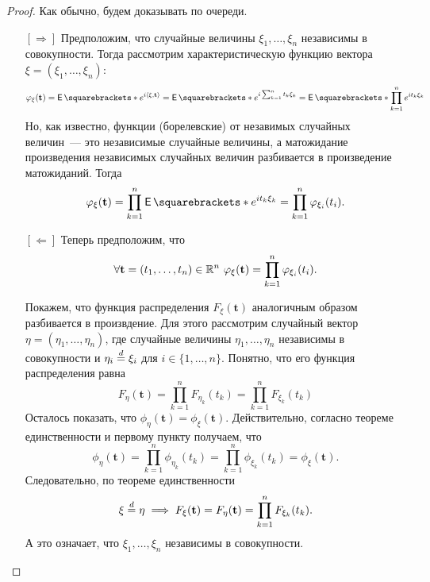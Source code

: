 \begin{proof}
	Как обычно, будем доказывать по очереди.
	\begin{itemize}
		\item[{\([\Rightarrow]\)}] Предположим, что случайные величины \(\xi_{1}, \dots, \xi_{n}\) независимы в совокупности. Тогда рассмотрим характеристическую функцию вектора \(\xi = (\xi_1, \dots, \xi_n)\):
		\[
			\phi_{\xi}(\mathbf{t}) = \E{e^{i\left\langle\xi, \mathbf{t}\right\rangle}} = \E{e^{i\sum_{k = 1}^{n} t_k\xi_k}} = \E{\prod_{k = 1}^{n} e^{it_k\xi_{k}}}
		\]
		Но, как известно, функции (борелевские) от незавимых случайных величин~--- это независимые случайные величины, а матожидание произведения независимых случайных величин разбивается в произведение матожиданий. Тогда
		\[
			\phi_{\xi}(\mathbf{t}) = \prod_{k = 1}^{n} \E{e^{it_k\xi_{k}}} = \prod_{k = 1}^{n} \phi_{\xi_i}(t_i).
		\]
		
		\item[{\([\Leftarrow]\)}] Теперь предположим, что
		\[
			\forall \mathbf{t} = (t_1, \dots, t_n) \in \mathbb{R}^n\ \varphi_{\xi}(\mathbf{t}) = \prod_{k = 1}^{n} \varphi_{\xi_i}(t_i).
		\]
		
		Покажем, что функция распределения \(F_{\xi}(\mathbf{t})\) аналогичным образом разбивается в произвдение. Для этого рассмотрим случайный вектор \(\eta = (\eta_1, \dots, \eta_n)\), где случайные величины \(\eta_1, \dots, \eta_n\) независимы в совокупности и \(\eta_{i} \overset{d}{=} \xi_{i}\) для \(i \in \{1, \dots, n\}\). Понятно, что его функция распределения равна
		\[
			F_{\eta}(\mathbf{t}) = \prod_{k = 1}^{n} F_{\eta_k}(t_k) = \prod_{k = 1}^{n} F_{\xi_k}(t_k)
		\]
		Осталось показать, что \(\phi_{\eta}(\mathbf{t}) = \phi_{\xi}(\mathbf{t})\). Действительно, согласно теореме единственности и первому пункту получаем, что
		\[
			\phi_{\eta}(\mathbf{t}) = \prod_{k = 1}^{n} \phi_{\eta_k}(t_k) = \prod_{k = 1}^{n} \phi_{\xi_k}(t_k) = \phi_{\xi}(\mathbf{t}).
		\]
		Следовательно, по теореме единственности
		\[
			\xi \overset{d}{=} \eta \implies F_{\xi}(\mathbf{t}) = F_{\eta}(\mathbf{t}) = \prod_{k = 1}^{n} F_{\xi_k}(t_k).
		\]
		А это означает, что \(\xi_{1}, \dots, \xi_{n}\) независимы в совокупности.
	\end{itemize}
\end{proof}

